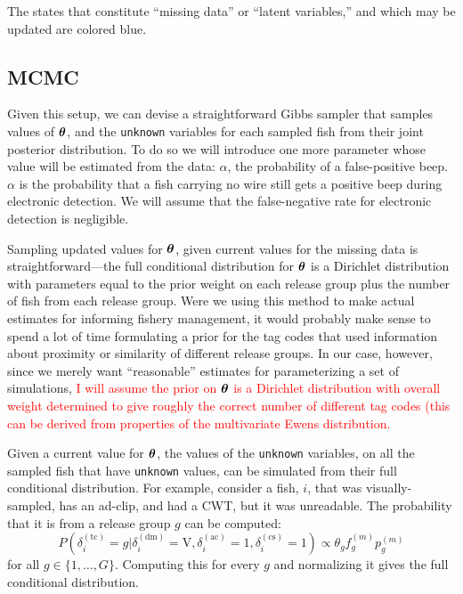 \documentclass[11pt]{article}
\def\bm#1{\mathpalette\bmstyle{#1}}
\def\bmstyle#1#2{\mbox{\boldmath$#1#2$}}
\newcommand{\btheta}{\bm{\theta}}
\begin{document}
The states that constitute ``missing data'' or ``latent variables,'' and which may be updated
are colored blue.

\subsection{MCMC}

Given this setup, we can devise a straightforward Gibbs sampler that samples values of $\btheta$, and the 
{\tt unknown} variables for each sampled fish from their joint posterior distribution. To do so we will
introduce one more parameter whose value will be estimated from the data:  $\alpha$, the probability
of a false-positive beep.  $\alpha$ is the probability that a fish carrying no wire still gets a positive
beep during electronic detection.  We will assume that the false-negative rate for electronic detection is
negligible.

Sampling updated values for $\btheta$, given current values for the missing data is straightforward---the 
full conditional distribution for $\btheta$ is a Dirichlet distribution
with parameters equal to the prior weight on each
release group plus the number of fish from each release group.  Were we using this method to make actual estimates
for informing fishery management, it would probably make sense to spend a lot of time formulating a prior
for the tag codes that used information about proximity or similarity of different release groups. In our
case, however, since we merely want ``reasonable'' estimates for parameterizing a set of simulations, \textcolor{red}{I will assume
the prior on $\btheta$ is a Dirichlet distribution with overall weight determined to give roughly the correct
number of different tag codes (this can be derived from properties of the multivariate Ewens distribution.}

Given a current value for $\btheta$, the values of the {\tt unknown} variables, on all the sampled fish that have
{\tt unknown} values, can be simulated from their full conditional distribution.  For example,
consider a fish, $i$, that was visually-sampled, has an ad-clip, and had a CWT, but it was unreadable.  The 
probability that it is from a release group $g$ can be computed:
\[
P(\delta_i^{(\mathrm{tc})} = g | \delta_i^{(\mathrm{dm})}=\mathrm{V}, \delta_i^{(\mathrm{ac})} = 1, \delta_i^{(\mathrm{cs})} = 1)
\propto
\theta_g f_g^{(m)} p_g^{(m)}
\]
for all $g \in \{1,\ldots,G\}$. Computing this for every $g$ and normalizing it gives the full conditional distribution.
\end{document}
